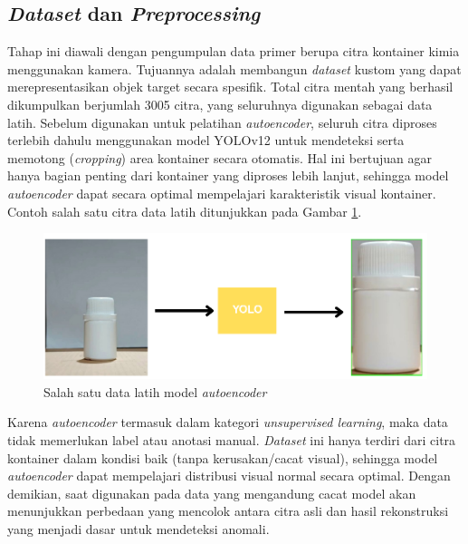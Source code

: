 \vspace{1em}

\subsection{\textit{Dataset} dan \textit{Preprocessing}}
\noindent
Tahap ini diawali dengan pengumpulan data primer berupa citra
kontainer kimia menggunakan kamera. Tujuannya adalah membangun
\textit{dataset} kustom yang dapat merepresentasikan objek target secara
spesifik. Total citra mentah yang berhasil dikumpulkan berjumlah 3005
citra, yang seluruhnya digunakan sebagai data latih. Sebelum
digunakan untuk pelatihan \textit{autoencoder}, seluruh citra diproses
terlebih dahulu menggunakan model YOLOv12 untuk mendeteksi serta
memotong (\textit{cropping}) area kontainer secara
otomatis. Hal ini bertujuan agar hanya bagian penting dari kontainer
yang diproses lebih lanjut, sehingga model \textit{autoencoder} dapat
secara optimal mempelajari karakteristik visual kontainer. Contoh
salah satu citra data latih ditunjukkan pada Gambar \ref{fig:ae-data}.

\begin{figure}[H]
  \centering
  \includegraphics[width=\textwidth]{gambar/ae_data.png}
  \caption{Salah satu data latih model \textit{autoencoder}}
  \label{fig:ae-data}
\end{figure}
\vspace{-1em}

Karena \textit{autoencoder} termasuk dalam kategori
\textit{unsupervised learning},
maka data tidak memerlukan label atau anotasi manual. \textit{Dataset} ini
hanya terdiri dari citra kontainer dalam kondisi baik (tanpa
kerusakan/cacat visual), sehingga model \textit{autoencoder} dapat mempelajari
distribusi visual normal secara optimal. Dengan demikian, saat
digunakan pada data yang mengandung cacat model akan menunjukkan
perbedaan yang mencolok antara citra asli dan hasil rekonstruksi yang
menjadi dasar untuk mendeteksi anomali.

